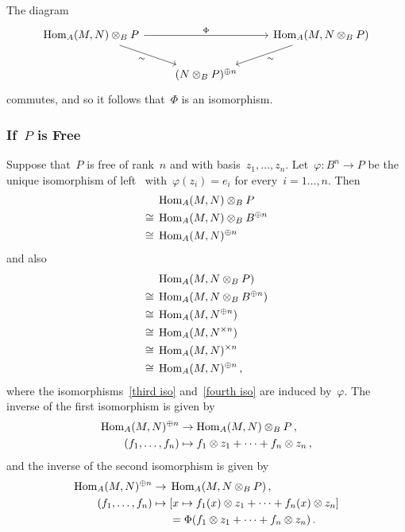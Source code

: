 The diagram
\[
  \begin{tikzcd}
      \Hom_A(M, N) \tensor_B P
      \arrow{dr}[below left]{\sim}
      \arrow{rr}[above]{\Phi}
    & {}
    & \Hom_A(M, N \tensor_B P)
      \arrow{dl}[below right]{\sim}
    \\
      {}
    & (N \tensor_B P)^{\oplus n}
    & {}
  \end{tikzcd}
\]
commutes, and so it follows that~$\Phi$ is an isomorphism.





\subsubsection{If~$P$ is Free}

Suppose that~$P$ is free of rank~$n$ and with basis~$z_1, \dotsc, z_n$.
Let~$\varphi \colon B^n \to P$ be the unique isomorphism of left~{} with~$\varphi(z_i) = e_i$ for every~$i = 1 \dotsc, n$.
Then
\begin{align}
       {}&  \operatorname{Hom}_A(M, N) \otimes_B P  \notag  \\
  \cong{}&  \operatorname{Hom}_A(M, N) \otimes_B B^{\oplus n} \label{third iso} \\
  \cong{}&  \operatorname{Hom}_A(M, N)^{\oplus n} \notag
\end{align}
and also
\begin{align}
       {}&  \operatorname{Hom}_A(M, N \otimes_B P)  \notag  \\
  \cong{}&  \operatorname{Hom}_A(M, N \otimes_B B^{\oplus n}) \label{fourth iso}  \\
  \cong{}&  \operatorname{Hom}_A(M, N^{\oplus n}) \notag  \\
  \cong{}&  \operatorname{Hom}_A(M, N^{\times n}) \notag  \\
  \cong{}&  \operatorname{Hom}_A(M, N)^{\times n}  \notag  \\
  \cong{}&  \operatorname{Hom}_A(M, N)^{\oplus n} \notag  \,,
\end{align}
where the isomorphisms~\eqref{third iso} and~\eqref{fourth iso} are induced by~$\varphi$.
The inverse of the first isomorphism is given by
\begin{align*}
            \operatorname{Hom}_A(M,N)^{\oplus n}
  &\to      \operatorname{Hom}_A(M,N) \otimes_B P \,,
  \\
            (f_1, \dotsc, f_n)
  &\mapsto  f_1 \otimes z_1 + \dotsb + f_n \otimes z_n \,,
\end{align*}
and the inverse of the second isomorphism is given by
\begin{align*}
              \operatorname{Hom}_A(M,N)^{\oplus n}
  \to{}&      \operatorname{Hom}_A(M, N \otimes_B P) \,,
  \\
              (f_1, \dotsc, f_n)
  \mapsto{}&  [x \mapsto f_1(x) \otimes z_1 + \dotsb + f_n(x) \otimes z_n]
  \\
              {}
  &=          \Phi( f_1 \otimes z_1 + \dotsb + f_n \otimes z_n ) \,.
\end{align*}
